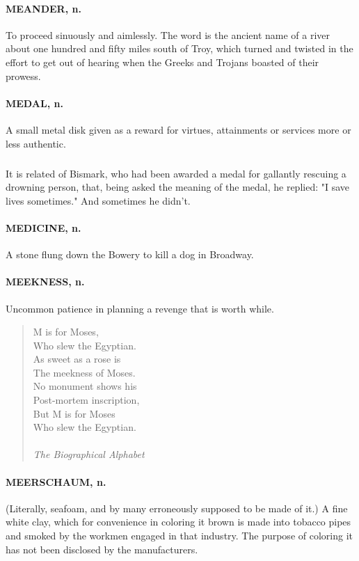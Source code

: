 \documentclass[11pt]{article}
\begin{document}
\paragraph{MEANDER, n.}  To proceed sinuously and aimlessly.  The word is the
ancient name of a river about one hundred and fifty miles south of
Troy, which turned and twisted in the effort to get out of hearing
when the Greeks and Trojans boasted of their prowess.

\paragraph{MEDAL, n.}  A small metal disk given as a reward for virtues,
attainments or services more or less authentic.
\subparagraph{}   It is related of Bismark, who had been awarded a medal for
gallantly rescuing a drowning person, that, being asked the meaning of
the medal, he replied:  "I save lives sometimes."  And sometimes he
didn't.

\paragraph{MEDICINE, n.}  A stone flung down the Bowery to kill a dog in Broadway.

\paragraph{MEEKNESS, n.}  Uncommon patience in planning a revenge that is worth
while.

\begin{quote}   M is for Moses, \\
      Who slew the Egyptian. \\
  As sweet as a rose is \\
  The meekness of Moses. \\
  No monument shows his \\
      Post-mortem inscription, \\
  But M is for Moses \\
      Who slew the Egyptian. \\
 \\
{\em The Biographical Alphabet} \end{quote}

\paragraph{MEERSCHAUM, n.}  (Literally, seafoam, and by many erroneously supposed
to be made of it.)  A fine white clay, which for convenience in
coloring it brown is made into tobacco pipes and smoked by the workmen
engaged in that industry.  The purpose of coloring it has not been
disclosed by the manufacturers.
\end{document}
